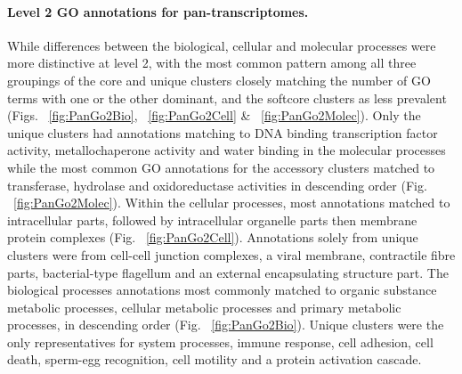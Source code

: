 \documentclass[12pt]{article}
\begin{document}
\paragraph{Level 2 GO annotations for pan-transcriptomes.}
\FloatBarrier
While differences between the biological, cellular and molecular processes were more distinctive at level 2, with the most common pattern among all three groupings of the core and unique clusters closely matching the number of GO terms with one or the other dominant, and the softcore clusters as less prevalent (Figs. ~\ref{fig:PanGo2Bio}, ~\ref{fig:PanGo2Cell} \& ~\ref{fig:PanGo2Molec}). 
Only the unique clusters had annotations matching to DNA binding transcription factor activity, metallochaperone activity and water binding in the molecular processes while the most common GO annotations for the accessory clusters matched to transferase, hydrolase and oxidoreductase activities in descending order (Fig. ~\ref{fig:PanGo2Molec}). 
Within the cellular processes, most annotations matched to intracellular parts, followed by intracellular organelle parts then membrane protein complexes (Fig. ~\ref{fig:PanGo2Cell}). 
Annotations solely from unique clusters were from cell-cell junction complexes, a viral membrane, contractile fibre parts, bacterial-type flagellum and an external encapsulating structure part. 
The biological processes annotations most commonly matched to organic substance metabolic processes, cellular metabolic processes and primary metabolic processes, in descending order (Fig. ~\ref{fig:PanGo2Bio}). 
Unique clusters were the only representatives for system processes, immune response, cell adhesion, cell death, sperm-egg recognition, cell motility and a protein activation cascade. 
\end{document}
